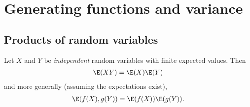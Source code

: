\documentclass{article}
\begin{document}
\section{Generating functions and variance}
\subsection{Products of random variables}
\begin{theorem}
	Let $X$ and $Y$ be \emph{independent} random variables with finite expected values.
	Then
	\begin{align*}
		\E(XY) = \E(X)\E(Y)
	\end{align*}
	and more generally (assuming the expectations exist),
	\begin{align*}
		\E(f(X), g(Y)) = \E(f(X))\E(g(Y)).
	\end{align*}
\end{theorem}
\end{document}
